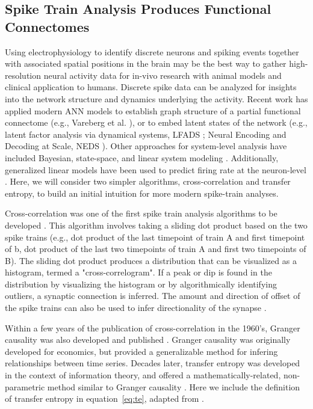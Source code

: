 \documentclass[11pt]{article}
\newcommand{\subsectionwithindent}[1]{
    \subsection*{#1}
    \hspace{\parindent} %
}
\begin{document}
\subsectionwithindent{Spike Train Analysis Produces Functional Connectomes}
Using electrophysiology to identify discrete neurons and spiking events together with associated spatial positions in the brain may be the best way to gather high-resolution neural activity data for in-vivo research with animal models and clinical application to humans. Discrete spike data can be analyzed for insights into the network structure and dynamics underlying the activity. Recent work has applied modern ANN models to establish graph structure of a partial functional connectome (e.g., Vareberg et al. \cite{vareberg2024wisconsinbins}), or to embed latent states of the network (e.g., latent factor analysis via dynamical systems, LFADS \cite{pandarinath2018autoencoders, keshtkaran2022large}; Neural Encoding and Decoding at Scale, NEDS \cite{zhang2025neds}). Other approaches for system-level analysis have included Bayesian, state-space, and linear system modeling \cite{brown1998statistical, paninski2010new, geadah2025modeling}. Additionally, generalized linear models have been used to predict firing rate at the neuron-level \cite{paninski2004mle, kobayashi2025connections}. Here, we will consider two simpler algorithms, cross-correlation and transfer entropy, to build an initial intuition for more modern spike-train analyses.

Cross-correlation was one of the first spike train analysis algorithms to be developed \cite{perkel1967crosscor}. This algorithm involves taking a sliding dot product based on the two spike trains (e.g., dot product of the last timepoint of train A and first timepoint of b, dot product of the last two timepoints of train A and first two timepoints of B). The sliding dot product produces a distribution that can be visualized as a histogram, termed a "cross-correlogram". If a peak or dip is found in the distribution by visualizing the histogram or by algorithmically identifying outliers, a synaptic connection is inferred. The amount and direction of offset of the spike trains can also be used to infer directionality of the synapse \cite{perkel1967crosscor, moore1970crosscor, kobayashi2025connections}.

Within a few years of the publication of cross-correlation in the 1960's, Granger causality was also developed and published \cite{granger1969causality}. Granger causality was originally developed for economics, but provided a generalizable method for infering relationships between time series. Decades later, transfer entropy was developed in the context of information theory, and offered a mathematically-related, non-parametric method similar to Granger causality \cite{schreiber2000te}. Here we include the definition of transfer entropy in equation~\eqref{eq:te}, adapted from \cite[Eq.~4]{schreiber2000te}.
\end{document}
